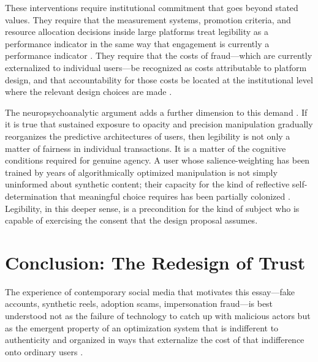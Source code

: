 \documentclass[12pt,a4paper]{article}
\begin{document}
These interventions require institutional commitment that goes beyond stated values. They require
that the measurement systems, promotion criteria, and resource allocation decisions inside large
platforms treat legibility as a performance indicator in the same way that engagement is currently
a performance indicator \citep{strathern1997}. They require that the costs of fraud---which are
currently externalized to individual users---be recognized as costs attributable to platform
design, and that accountability for those costs be located at the institutional level where the
relevant design choices are made \citep{noble2018,zuboff2019}.

The neuropsychoanalytic argument adds a further dimension to this demand \citep{dallaglio2024,friston2010}.
If it is true that sustained exposure to opacity and precision manipulation gradually reorganizes
the predictive architectures of users, then legibility is not only a matter of fairness in
individual transactions. It is a matter of the cognitive conditions required for genuine agency.
A user whose salience-weighting has been trained by years of algorithmically optimized
manipulation is not simply uninformed about synthetic content; their capacity for the kind of
reflective self-determination that meaningful choice requires has been partially colonized
\citep{zuboff2019,dallaglio2024}. Legibility, in this deeper sense, is a precondition for the
kind of subject who is capable of exercising the consent that the design proposal assumes.

\section{Conclusion: The Redesign of Trust}

The experience of contemporary social media that motivates this essay---fake accounts, synthetic
reels, adoption scams, impersonation fraud---is best understood not as the failure of technology
to catch up with malicious actors but as the emergent property of an optimization system that
is indifferent to authenticity and organized in ways that externalize the cost of that
indifference onto ordinary users \citep{zuboff2019,gillespie2018}.
\end{document}

